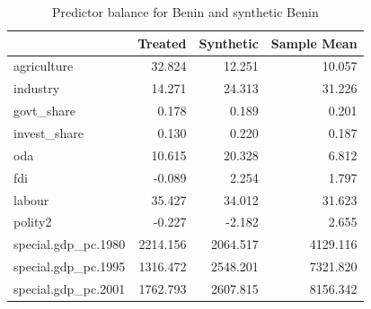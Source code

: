 \begin{table}

\caption{Predictor balance for Benin and synthetic Benin}
\centering
\begin{tabular}[t]{lrrr}
\toprule
  & Treated & Synthetic & Sample Mean\\
\midrule
agriculture & 32.824 & 12.251 & 10.057\\
industry & 14.271 & 24.313 & 31.226\\
govt\_share & 0.178 & 0.189 & 0.201\\
invest\_share & 0.130 & 0.220 & 0.187\\
oda & 10.615 & 20.328 & 6.812\\
\addlinespace
fdi & -0.089 & 2.254 & 1.797\\
labour & 35.427 & 34.012 & 31.623\\
polity2 & -0.227 & -2.182 & 2.655\\
special.gdp\_pc.1980 & 2214.156 & 2064.517 & 4129.116\\
special.gdp\_pc.1995 & 1316.472 & 2548.201 & 7321.820\\
\addlinespace
special.gdp\_pc.2001 & 1762.793 & 2607.815 & 8156.342\\
\bottomrule
\end{tabular}
\end{table}
